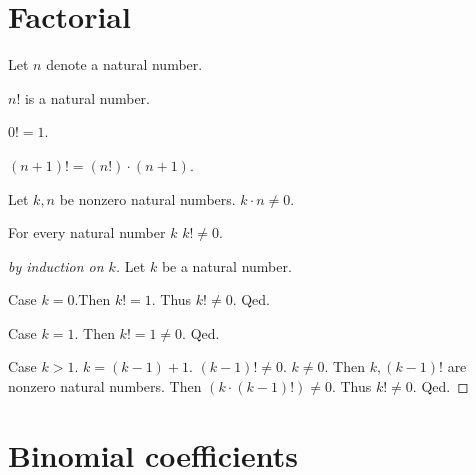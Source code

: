 \documentclass{article}
\begin{document}
\section{Factorial}

\begin{forthel}

Let $n$ denote a natural number.
\begin{signature}
$n!$ is a natural number.
\end{signature}

\begin{axiom}
$0!=1$.
\end{axiom}

\begin{axiom}
$(n+1)!=(n!) \cdot (n+1)$.
\end{axiom}

\begin{lemma}
Let $k,n$ be nonzero natural numbers. $k \cdot n \neq 0$. 
\end{lemma}

\begin{theorem}
For every natural number $k$ $k! \neq 0$.
\end{theorem}
\begin{proof}[by induction on $k$]
Let $k$ be a natural number.

Case $k = 0$.Then $k! = 1$. Thus $k! \neq 0$. Qed.

Case $k = 1$. Then $k! = 1 \neq 0$. Qed.

Case $k > 1$. $k = (k-1)+1$. $(k-1)! \neq 0$. $k \neq 0$. Then $k, (k-1)!$ are nonzero natural numbers.
Then $(k \cdot (k-1)!) \neq 0$. Thus $k! \neq 0$.  Qed.
\end{proof} 

\end{forthel}

\section{Binomial coefficients}
\end{document}
